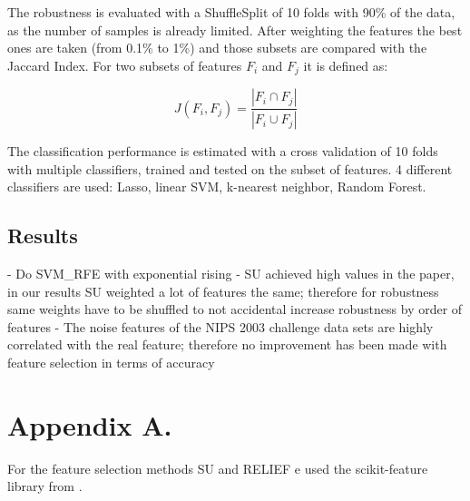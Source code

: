 \documentclass[twoside,11pt]{article}
\begin{document}
The robustness is evaluated with a ShuffleSplit of 10 folds with 90\% of the data, as the number of samples is already limited. After weighting the features the best ones are taken (from 0.1\% to 1\%) and those subsets are compared with the Jaccard Index. For two subsets of features $F_i$ and $F_j$ it is defined as:

\begin{equation}
J(F_i, F_j) = \frac{| F_i \cap F_j |}{| F_i \cup F_j |}
\end{equation}

The classification performance is estimated with a cross validation of 10 folds with multiple classifiers, trained and tested on the subset of features. 4 different classifiers are used: Lasso, linear SVM, k-nearest neighbor, Random Forest.

\subsection{Results}
- Do SVM\_RFE with exponential rising
- SU achieved high values in the paper, in our results SU weighted a lot of features the 
same; therefore for robustness same weights have to be shuffled to not accidental increase
robustness by order of features
- The noise features of the NIPS 2003 challenge data sets are highly correlated with the
real feature; therefore no improvement has been made with feature selection in terms of 
accuracy



\newpage

\appendix
\section*{Appendix A.}
For the feature selection methods SU and RELIEF e used the scikit-feature library from \cite{Li-etal16}.
\label{app:some appendix}


\vskip 0.2in

\end{document}
